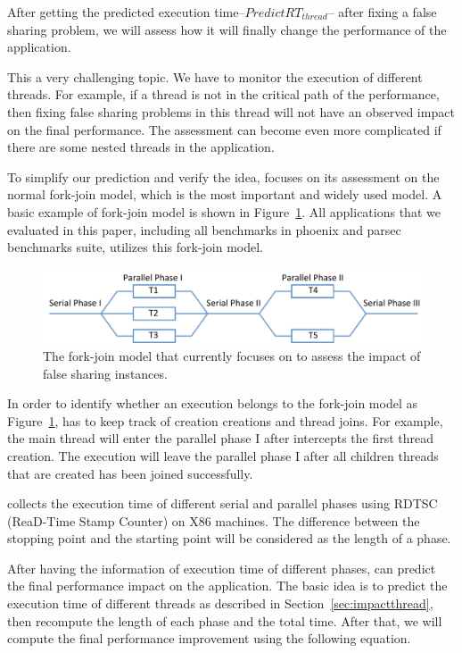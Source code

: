 After getting the predicted execution time--$PredictRT_{thread}$-- after fixing a false sharing problem, we will assess how it will finally change the performance of the application. 

This a very challenging topic.  We have to monitor the execution of different threads. For example, if a thread is not in the critical path of the performance, then fixing false sharing problems in this thread will not have an observed impact on the final performance. The assessment can become even more complicated if there are some nested threads in the application. 

To simplify our prediction and verify the idea, \cheetah{} focuses on its assessment on the normal fork-join model, which is the most important and widely used model. A basic example of fork-join model is shown in  Figure~\ref{fig:forkjoinmodel}. All applications that we evaluated in this paper, including all benchmarks in phoenix and parsec benchmarks suite, utilizes this fork-join model. 

\begin{figure}[ht!]
\begin{center}
\includegraphics[width=6in]{figure/forkjoin}
\end{center}
\caption{The fork-join model that \Cheetah{} currently focuses on to assess the impact of false sharing instances. 
\label{fig:forkjoinmodel}}
\end{figure}

In order to identify whether an execution belongs to the fork-join model as Figure~\ref{fig:forkjoinmodel}, \cheetah{} has to keep track of creation creations and thread joins. For example, the main thread will enter the parallel phase I after \cheetah{} intercepts the first thread creation. The execution will leave the parallel phase I after all children threads that are created has been joined successfully. 

\Cheetah{} collects the execution time of different serial and parallel phases using RDTSC (ReaD-Time Stamp Counter) on X86 machines. The difference between the stopping point and the starting point will be considered as the length of a phase. 

After having the information of execution time of different phases, \cheetah{} can predict the final performance impact on the application. The basic idea is to predict the execution time of different threads as described in Section~\ref{sec:impactthread}, then recompute the length of each phase and the total time. After that, we will compute the final performance improvement using the following equation. 


